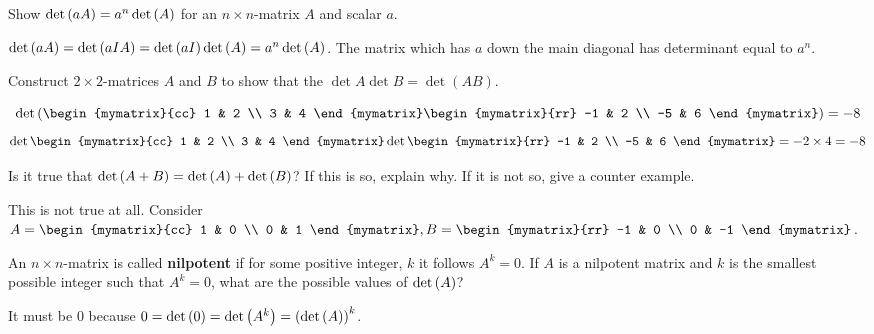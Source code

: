 \begin{enumialphparenastyle}
\begin{ex} Show $\det \left(aA\right) =a^{n}\det \left(A\right) $ for an $n \times n $-matrix $A
$ and scalar $a$. 
\begin{sol}
$\det \left(aA\right) =\det
\left(aIA\right) =\det \left(aI\right) \det \left(A\right) =a^{n}\det
\left(A\right)$. The matrix which has $a$ down the main diagonal has
determinant equal to $a^{n}$.
\end{sol}
\end{ex}


\begin{ex} Construct $2\times 2$-matrices $A$ and $B$ to show that the
$\det A \det B = \det (AB)$. 
\begin{sol}
\[
\det
\tup{\begin{mymatrix}{cc}
1 & 2 \\
3 & 4
\end{mymatrix} \begin{mymatrix}{rr}
-1 & 2 \\
-5 & 6
\end{mymatrix} } = -8
\]
\[
\det \begin{mymatrix}{cc}
1 & 2 \\
3 & 4
\end{mymatrix} \det \begin{mymatrix}{rr}
-1 & 2 \\
-5 & 6
\end{mymatrix} = -2 \times 4 = -8
\]
\end{sol}
\end{ex}

\begin{ex} Is it true that $\det \left(A+B\right) =\det \left(A\right) +\det
\left(B\right)$? If this is so, explain why. If it is not so,
give a counter example.  
\begin{sol}
This is not true at all. Consider $A=\begin{mymatrix}{cc}
1 & 0 \\
0 & 1
\end{mymatrix} ,B=\begin{mymatrix}{rr}
-1 & 0 \\
0 & -1
\end{mymatrix}$.
\end{sol}
\end{ex}

\begin{ex} An $n\times n$-matrix is called \textbf{nilpotent}
 if for some positive integer, $k$ it follows $A^{k}=0$. If
$A$ is a nilpotent matrix and $k$ is the smallest possible integer such that
$A^{k}=0$, what are the possible values of $\det \left(A\right)$? 
\begin{sol}
It must
be 0 because $0=\det \left(0\right) =\det \left(A^{k}\right) =\left(\det
\left(A\right) \right) ^{k}$.
\end{sol}
\end{ex}


\end{enumialphparenastyle}
